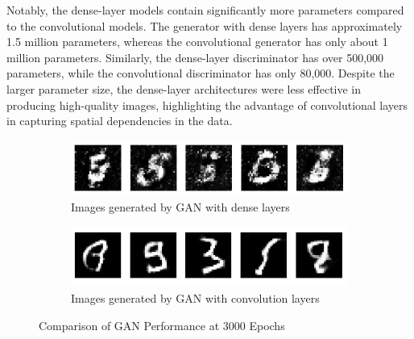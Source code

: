 Notably, the dense-layer models contain significantly more parameters compared to the convolutional models. The generator with dense layers has approximately 1.5 million parameters, whereas the convolutional generator has only about 1 million parameters. Similarly, the dense-layer discriminator has over 500,000 parameters, while the convolutional discriminator has only 80,000. Despite the larger parameter size, the dense-layer architectures were less effective in producing high-quality images, highlighting the advantage of convolutional layers in capturing spatial dependencies in the data.


\begin{figure}[H]
    \centering
    \begin{subfigure}[b]{\linewidth}
        \centering
        \includegraphics[width=0.7\linewidth]{./Images/generate_image_by_dense_layer.jpg}
        \caption{Images generated by GAN with dense layers}
        \label{fig:generated_dense}
    \end{subfigure}
    \vspace{0.05\linewidth} 
    \begin{subfigure}[b]{\linewidth}
        \centering
        \includegraphics[width=0.7\linewidth]{./Images/generate_image_by_Convolution_layer.jpg}
        \caption{Images generated by GAN with convolution layers}
        \label{fig:generated_conv}
    \end{subfigure}
    \caption{Comparison of GAN Performance at 3000 Epochs}
    \label{fig:generated_images}
\end{figure}

